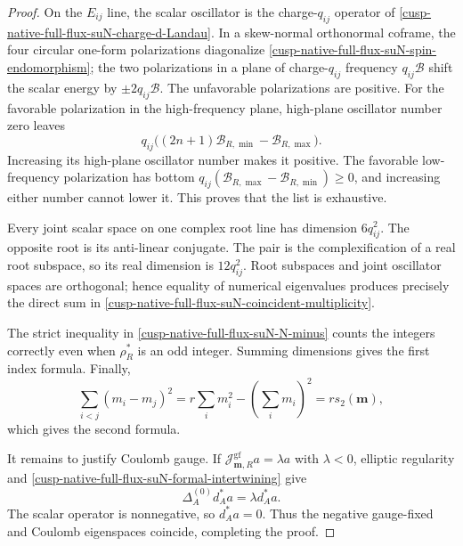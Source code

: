 \begin{proof}
On the \(E_{ij}\) line, the scalar oscillator is the charge-\(q_{ij}\)
operator of \cref{cusp-native-full-flux-suN-charge-d-Landau}.  In a
skew-normal orthonormal coframe, the four circular one-form polarizations
diagonalize \cref{cusp-native-full-flux-suN-spin-endomorphism}; the two
polarizations in a plane of charge-\(q_{ij}\) frequency
\(q_{ij}\mathcal B\) shift the scalar energy by
\(\pm2q_{ij}\mathcal B\).  The unfavorable polarizations are positive.
For the favorable polarization in the high-frequency plane, high-plane
oscillator number zero leaves
\[
 q_{ij}\bigl((2n+1)\mathcal B_{R,\min}
             -\mathcal B_{R,\max}\bigr).
\]
Increasing its high-plane oscillator number makes it positive.  The
favorable low-frequency polarization has bottom
\(q_{ij}(\mathcal B_{R,\max}-\mathcal B_{R,\min})\ge0\), and increasing
either number cannot lower it.  This proves that the list is exhaustive.

Every joint scalar space on one complex root line has dimension
\(6q_{ij}^2\).  The opposite root is its anti-linear conjugate.  The pair is
the complexification of a real root subspace, so its real dimension is
\(12q_{ij}^2\).  Root subspaces and joint oscillator spaces are orthogonal;
hence equality of numerical eigenvalues produces precisely the direct sum
in \cref{cusp-native-full-flux-suN-coincident-multiplicity}.

The strict inequality in
\cref{cusp-native-full-flux-suN-N-minus} counts the integers correctly even
when \(\rho_R^*\) is an odd integer.  Summing dimensions gives the first
index formula.  Finally,
\[
 \sum_{i<j}(m_i-m_j)^2
 =r\sum_i m_i^2-\left(\sum_i m_i\right)^2
 =rs_2(\mathbf m),
\]
which gives the second formula.

It remains to justify Coulomb gauge.  If
\(\mathcal J_{\mathbf m,R}^{\mathrm{gf}}a=\lambda a\) with
\(\lambda<0\), elliptic regularity and
\cref{cusp-native-full-flux-suN-formal-intertwining} give
\[
 \Delta_A^{(0)}d_A^*a=\lambda d_A^*a.
\]
The scalar operator is nonnegative, so \(d_A^*a=0\).  Thus the negative
gauge-fixed and Coulomb eigenspaces coincide, completing the proof.
\end{proof}

